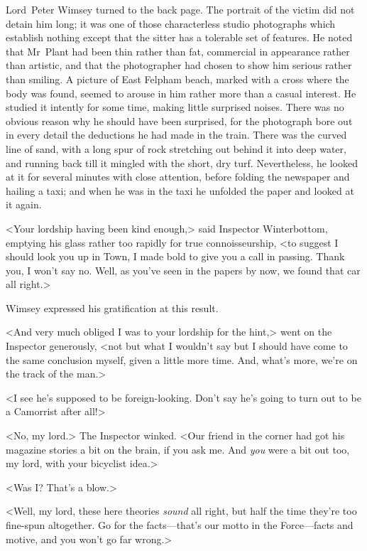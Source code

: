 Lord~Peter Wimsey turned to the back page. The portrait of the victim did not detain him long; it was one of those characterless studio photographs which establish nothing except that the sitter has a tolerable set of features. He noted that Mr~Plant had been thin rather than fat, commercial in appearance rather than artistic, and that the photographer had chosen to show him serious rather than smiling. A picture of East Felpham beach, marked with a cross where the body was found, seemed to arouse in him rather more than a casual interest. He studied it intently for some time, making little surprised noises. There was no obvious reason why he should have been surprised, for the photograph bore out in every detail the deductions he had made in the train. There was the curved line of sand, with a long spur of rock stretching out behind it into deep water, and running back till it mingled with the short, dry turf. Nevertheless, he looked at it for several minutes with close attention, before folding the newspaper and hailing a taxi; and when he was in the taxi he unfolded the paper and looked at it again.

<Your lordship having been kind enough,> said Inspector Winterbottom, emptying his glass rather too rapidly for true connoisseurship, <to suggest I should look you up in Town, I made bold to give you a call in passing. Thank you, I won't say no. Well, as you've seen in the papers by now, we found that car all right.>

Wimsey expressed his gratification at this result.

<And very much obliged I was to your lordship for the hint,> went on the Inspector generously, <not but what I wouldn't say but I should have come to the same conclusion myself, given a little more time. And, what's more, we're on the track of the man.>

<I see he's supposed to be foreign-looking. Don't say he's going to turn out to be a Camorrist after all!>

<No, my lord.> The Inspector winked. <Our friend in the corner had got his magazine stories a bit on the brain, if you ask me. And \textit{you} were a bit out too, my lord, with your bicyclist idea.>

<Was I\@? That's a blow.>

<Well, my lord, these here theories \textit{sound} all right, but half the time they're too fine-spun altogether. Go for the facts—that's our motto in the Force—facts and motive, and you won't go far wrong.>

